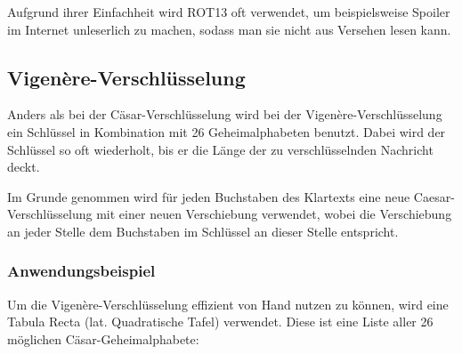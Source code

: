Aufgrund ihrer Einfachheit wird ROT13 oft verwendet, um beispielsweise Spoiler im Internet unleserlich zu machen, sodass man sie nicht aus Versehen lesen kann.


\newpage %
\subsection{Vigenère-Verschlüsselung}
\label{sec:vigenere}
Anders als bei der Cäsar-Verschlüsselung wird bei der Vigenère-Verschlüsselung ein Schlüssel in Kombination mit 26 Geheimalphabeten benutzt. Dabei wird der Schlüssel so oft wiederholt, bis er die Länge der zu verschlüsselnden Nachricht deckt.

Im Grunde genommen wird für jeden Buchstaben des Klartexts eine neue Caesar-Verschlüsselung mit einer neuen Verschiebung verwendet, wobei die Verschiebung an jeder Stelle dem Buchstaben im Schlüssel an dieser Stelle entspricht.


\subsubsection{Anwendungsbeispiel}
\label{sec:v-anwendungsbeispiel}
Um die Vigenère-Verschlüsselung effizient von Hand nutzen zu können, wird eine Tabula Recta (lat. Quadratische Tafel) verwendet. Diese ist eine Liste aller 26 möglichen Cäsar-Geheimalphabete:

